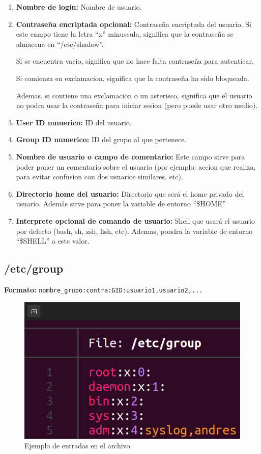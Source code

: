 \documentclass{article}
\begin{document}
\begin{enumerate}
    \item \textbf{Nombre de login: }Nombre de usuario.
    \item \textbf{Contraseña encriptada opcional: }Contraseña encriptada del usuario.
    Si este campo tiene la letra ``x'' minuscula, significa que la contraseña se almacena en ``/etc/shadow''.

    Si se encuentra vacio, significa que no hace falta contraseña para autenticar.

    Si comienza en exclamacion, significa que la contraseña ha sido bloqueada.

    Ademas, si contiene una exclamacion o un asterisco, significa que el usuario no podra usar la contraseña para iniciar sesion (pero puede usar otro medio).

    \item \textbf{User ID numerico: }ID del usuario.
    \item \textbf{Group ID numerico: }ID del grupo al que pertenece.
    \item \textbf{Nombre de usuario o campo de comentario: }Este campo sirve para poder poner un comentario sobre el usuario (por ejemplo: accion que realiza, para evitar confusion con dos usuarios similares, etc).
    \item \textbf{Directorio home del usuario: }Directorio que será el home privado del usuario. Además sirve para poner la variable de entorno ``\$HOME''
    \item \textbf{Interprete opcional de comando de usuario: }Shell que usará el usuario por defecto (bash, sh, zsh, fish, etc). Ademas, pondra la variable de entorno ``\$SHELL'' a este valor.
\end{enumerate}


\subsection{/etc/group}
\textbf{Formato: }\verb|nombre_grupo:contra:GID:usuario1,usuario2,...|

\begin{figure}[H]
    \includegraphics[width=\textwidth]{imagenes/groupfile.png}
    \caption{Ejemplo de entradas en el archivo.}    
\end{figure}
\end{document}
